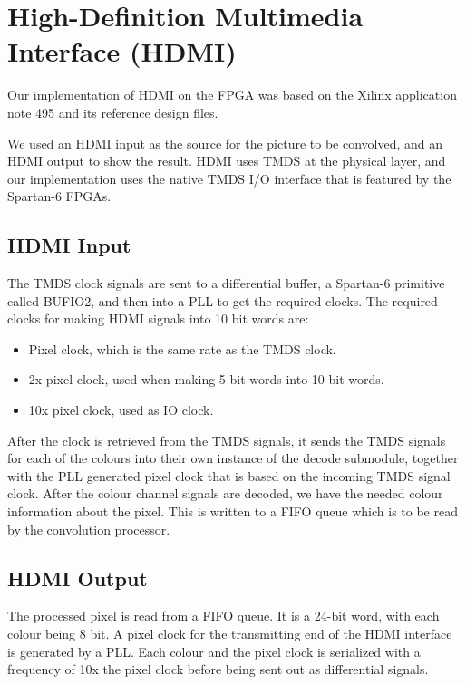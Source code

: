 \section{High-Definition Multimedia Interface (HDMI)}
Our implementation of HDMI on the FPGA was based on the Xilinx application note 495 \cite{xapp495} and its reference design files.

We used an HDMI input as the source for the picture to be convolved, and an HDMI output to show the result.
HDMI uses TMDS at the physical layer, and our implementation uses the native TMDS I/O interface that is featured by the Spartan-6 FPGAs.

\subsection{HDMI Input}
The TMDS clock signals are sent to a differential buffer, a Spartan-6 primitive called BUFIO2, and then into a PLL to get the required clocks. The required clocks for making HDMI signals into 10 bit words are:
\begin{itemize}
    \item   Pixel clock, which is the same rate as the TMDS clock.
    \item   2x pixel clock, used when making 5 bit words into 10 bit words.
    \item   10x pixel clock, used as IO clock.
\end{itemize}

After the clock is retrieved from the TMDS signals, it sends the TMDS signals for each of the colours into their own instance of the decode submodule, together with the PLL generated pixel clock that is based on the incoming TMDS signal clock. After the colour channel signals are decoded, we have the needed colour information about the pixel. This is written to a FIFO queue which is to be read by the convolution processor.

\subsection{HDMI Output}

The processed pixel is read from a FIFO queue. It is a 24-bit word, with each colour being 8 bit. A pixel clock for the transmitting end of the HDMI interface is generated by a PLL. Each colour and the pixel clock is serialized with a frequency of 10x the pixel clock before being sent out as differential signals.
